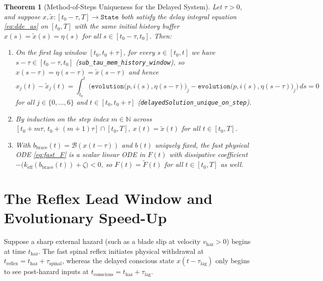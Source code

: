 \documentclass[11pt,a4paper]{article}
\newtheorem{theorem}{Theorem}[section]
\theoremstyle{definition}
\begin{document}
\begin{theorem}[Method-of-Steps Uniqueness for the Delayed System]
\label{thm:method_of_steps}
Let $\tau > 0$, and suppose $x, \widetilde{x} : [t_0 - \tau, T] \to \texttt{State}$ both satisfy the delay integral equation \eqref{eq:dde_as} on $[t_0, T]$ with the same initial history buffer $x(s) = \widetilde{x}(s) = \eta(s)$ for all $s \in [t_0 - \tau, t_0]$. Then:
\begin{enumerate}
  \item On the first lag window $[t_0, t_0 + \tau]$, for every $s \in [t_0, t]$ we have $s - \tau \in [t_0 - \tau, t_0]$ (\texttt{sub\_tau\_mem\_history\_window}), so $x(s - \tau) = \eta(s - \tau) = \widetilde{x}(s - \tau)$ and hence
  \begin{equation}
    x_j(t) - \widetilde{x}_j(t) = \int_{t_0}^t \Big(\texttt{evolution}\big(p, i(s), \eta(s-\tau)\big)_j - \texttt{evolution}\big(p, i(s), \eta(s-\tau)\big)_j\Big)\,ds = 0
  \end{equation}
  for all $j \in \{0, \dots, 6\}$ and $t \in [t_0, t_0 + \tau]$ (\texttt{delayedSolution\_unique\_on\_step}).
  \item By induction on the step index $m \in \mathbb{N}$ across $[t_0 + m\tau,\, t_0 + (m+1)\tau] \cap [t_0, T]$, $x(t) = \widetilde{x}(t)$ for all $t \in [t_0, T]$.
  \item With $b_{\mathrm{brace}}(t) = \mathcal{B}(x(t - \tau))$ and $b(t)$ uniquely fixed, the fast physical ODE \eqref{eq:fast_F} is a scalar linear ODE in $F(t)$ with dissipative coefficient $-\big(k_{\mathrm{eff}}(b_{\mathrm{brace}}(t)) + \zeta\big) < 0$, so $F(t) = \widetilde{F}(t)$ for all $t \in [t_0, T]$ as well.
\end{enumerate}
\end{theorem}

\section{The Reflex Lead Window and Evolutionary Speed-Up}

Suppose a sharp external hazard (such as a blade slip at velocity $v_{\mathrm{haz}} > 0$) begins at time $t_{\mathrm{haz}}$. The fast spinal reflex initiates physical withdrawal at $t_{\mathrm{reflex}} = t_{\mathrm{haz}} + \tau_{\mathrm{spinal}}$, whereas the delayed conscious state $x(t - \tau_{\mathrm{lag}})$ only begins to see post-hazard inputs at $t_{\mathrm{conscious}} = t_{\mathrm{haz}} + \tau_{\mathrm{lag}}$.
\end{document}

